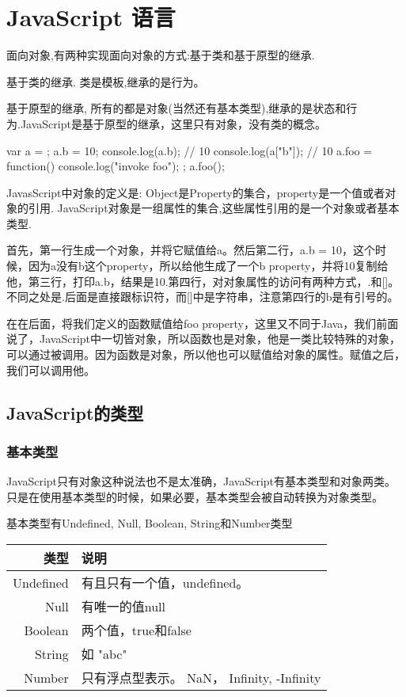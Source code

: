 \renewcommand\lstlistingname{Mocha}  
\chapter{JavaScript 语言}

面向对象,有两种实现面向对象的方式:基于类和基于原型的继承.

基于类的继承. 类是模板,继承的是行为。
	
基于原型的继承, 所有的都是对象(当然还有基本类型),继承的是状态和行为.JavaScript是基于原型的继承，这里只有对象，没有类的概念。

\begin{JavaScript}
var a = {};	
a.b = 10;
console.log(a.b); // 10
console.log(a["b"]); // 10
a.foo = function() {
	console.log("invoke foo");
};
a.foo();
\end{JavaScript}

JavasScript中对象的定义是: Object是Property的集合，property是一个值或者对象的引用. JavaScript对象是一组属性的集合,这些属性引用的是一个对象或者基本类型.
	
首先，第一行生成一个对象，并将它赋值给a。然后第二行，a.b = 10，这个时候，因为a没有b这个property，所以给他生成了一个b property，并将10复制给他，第三行，打印a.b，结果是10.第四行，对对象属性的访问有两种方式，.和[]。不同之处是.后面是直接跟标识符，而[]中是字符串，注意第四行的b是有引号的。
	
在在后面，将我们定义的函数赋值给foo property，这里又不同于Java，我们前面说了，JavaScript中一切皆对象，所以函数也是对象，他是一类比较特殊的对象，可以通过被调用。因为函数是对象，所以他也可以赋值给对象的属性。赋值之后，我们可以调用他。
	
\section{JavaScript的类型}

\subsection{基本类型}

JavaScript只有对象这种说法也不是太准确，JavaScript有基本类型和对象两类。只是在使用基本类型的时候，如果必要，基本类型会被自动转换为对象类型。

基本类型有Undefined, Null, Boolean, String和Number类型

\begin{tabular}{|r|l|}
\hline
类型 & 说明 \\
\hline
Undefined & 有且只有一个值，undefined。\\
\hline
Null & 有唯一的值null \\
\hline
Boolean & 两个值，true和false \\
\hline
String & 如 "abc" \\
\hline
Number & 只有浮点型表示。 NaN， Infinity, -Infinity \\
\hline
\end{tabular}

